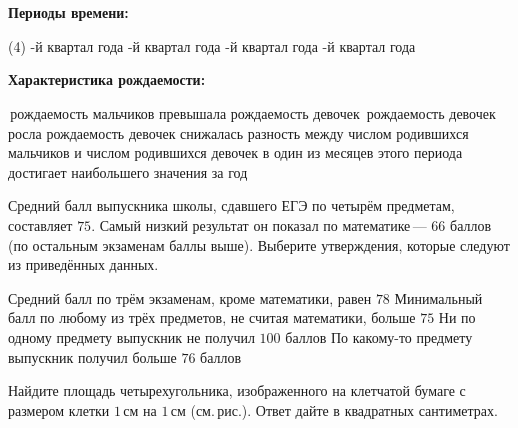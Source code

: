 \begin{homework}[number=3]
\begin{listofex}
\begin{minipage}[t]{0.5\linewidth}
		\end{minipage}
		\\
		\\
		\textbf{Периоды времени:}
		\begin{tasks}(4)
			-й квартал года
			-й квартал года
			-й квартал года
			-й квартал года
		\end{tasks}
		\textbf{Характеристика рождаемости:}
		\begin{tasks}
			\task рождаемость мальчиков превышала рождаемость девочек
			\task рождаемость девочек росла
			\task рождаемость девочек снижалась
			\task разность между числом родившихся мальчиков и числом родившихся девочек в один из месяцев этого периода достигает наибольшего значения за год
		\end{tasks}
		\item Средний балл выпускника школы, сдавшего ЕГЭ по четырём предметам, составляет \(75\). Самый низкий результат он показал по математике --- \(66\) баллов (по остальным экзаменам баллы выше). Выберите утверждения, которые следуют из приведённых данных.
		\begin{tasks}
			\task Средний балл по трём экзаменам, кроме математики, равен \(78\)
			\task Минимальный балл по любому из трёх предметов, не считая математики, больше \(75\)
			\task Ни по одному предмету выпускник не получил \(100\) баллов
			\task По какому-то предмету выпускник получил больше \(76\) баллов
		\end{tasks}
		\item
		\begin{minipage}[t]{0.68\linewidth}
			Найдите площадь четырехугольника, изображенного на клетчатой бумаге с размером клетки \(1\) см на \(1\) см (см. рис.). Ответ дайте в квадратных сантиметрах.
		\end{minipage}
		\hspace{0.02\linewidth}
		\begin{minipage}[t]{0.27\linewidth}

\end{minipage}
\end{listofex}
\end{homework}
